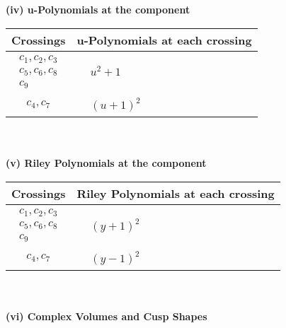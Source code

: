 \documentclass[1p]{elsarticle_modified}
\theoremstyle{definition}
\begin{document}
\newpage\renewcommand{\arraystretch}{1}
\flushleft \textbf{(iv) u-Polynomials at the component}\newline \\
\begin{tabular}{m{50pt}|m{274pt}}
Crossings & \hspace{64pt}u-Polynomials at each crossing \\
\hline $$\begin{aligned}c_{1},c_{2},c_{3}\\c_{5},c_{6},c_{8}\\c_{9}\end{aligned}$$&$\begin{aligned}
&u^2+1
\end{aligned}$\\
\hline $$\begin{aligned}c_{4},c_{7}\end{aligned}$$&$\begin{aligned}
&(u+1)^2
\end{aligned}$\\
\hline
\end{tabular}\\~\\
\newpage\renewcommand{\arraystretch}{1}
\flushleft \textbf{(v) Riley Polynomials at the component}\newline \\
\begin{tabular}{m{50pt}|m{274pt}}
Crossings & \hspace{64pt}Riley Polynomials at each crossing \\
\hline $$\begin{aligned}c_{1},c_{2},c_{3}\\c_{5},c_{6},c_{8}\\c_{9}\end{aligned}$$&$\begin{aligned}
&(y+1)^2
\end{aligned}$\\
\hline $$\begin{aligned}c_{4},c_{7}\end{aligned}$$&$\begin{aligned}
&(y-1)^2
\end{aligned}$\\
\hline
\end{tabular}\\~\\
\newpage\flushleft \textbf{(vi) Complex Volumes and Cusp Shapes}
\end{document}
